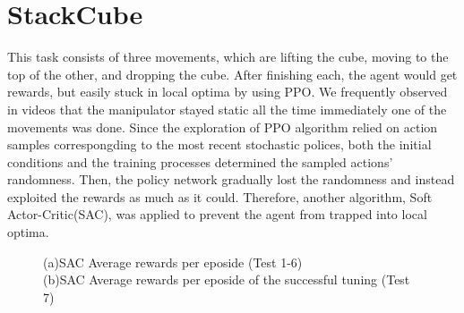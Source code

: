\documentclass[letterpaper,11pt]{article}
\begin{document}
\section{StackCube}
This task consists of three movements, which are lifting the cube, moving to the top of the other, and dropping the cube.
After finishing each, the agent would get rewards, but easily stuck in local optima by using PPO. We frequently 
observed in videos that the manipulator stayed static all the time immediately one of the movements was done. Since the exploration 
of PPO algorithm relied on action samples correspongding to the most recent stochastic polices, both the initial conditions
and the training processes determined the sampled actions' randomness. Then, the policy network gradually lost the randomness and 
instead exploited the rewards as much as it could. Therefore, another algorithm, Soft Actor-Critic(SAC)\cite{sac}, was applied to 
prevent the agent from trapped into local optima. 

\begin{figure}[ht] 
  \centering
  \captionsetup{justification=centering}
  \caption{(a)SAC Average rewards per eposide (Test 1-6) \\
  (b)SAC Average rewards per eposide of the successful tuning (Test 7)}
    \label{fig:sac1}
\end{figure}
\end{document}
